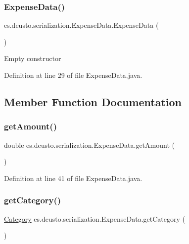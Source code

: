 \subsubsection{\texorpdfstring{Expense\+Data()}{ExpenseData()}\hspace{0.1cm}{\footnotesize\ttfamily [2/2]}}
{\footnotesize\ttfamily es.\+deusto.\+serialization.\+Expense\+Data.\+Expense\+Data (\begin{DoxyParamCaption}{ }\end{DoxyParamCaption})}

Empty constructor 

Definition at line 29 of file Expense\+Data.\+java.



\subsection{Member Function Documentation}
\mbox{\label{classes_1_1deusto_1_1serialization_1_1_expense_data_a9b0652de8009eca9d315aa0d041138a2}} 
\subsubsection{\texorpdfstring{get\+Amount()}{getAmount()}}
{\footnotesize\ttfamily double es.\+deusto.\+serialization.\+Expense\+Data.\+get\+Amount (\begin{DoxyParamCaption}{ }\end{DoxyParamCaption})}



Definition at line 41 of file Expense\+Data.\+java.

\mbox{\label{classes_1_1deusto_1_1serialization_1_1_expense_data_aa53e9ee1ef7220a272b043e475f504f1}} 
\subsubsection{\texorpdfstring{get\+Category()}{getCategory()}}
{\footnotesize\ttfamily \hyperlink{enumes_1_1deusto_1_1server_1_1jdo_1_1_category}{Category} es.\+deusto.\+serialization.\+Expense\+Data.\+get\+Category (\begin{DoxyParamCaption}{ }\end{DoxyParamCaption})}



